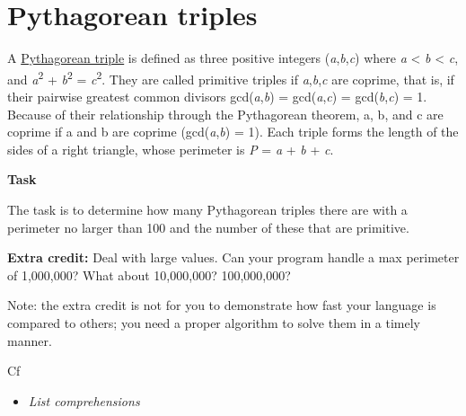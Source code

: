 \pagebreak{}
\section*{Pythagorean triples}

A \href{http://en.wikipedia.org/wiki/Pythagorean\_triple}{Pythagorean
triple} is defined as three positive integers
(\emph{a},\emph{b},\emph{c}) where \emph{a} \textless{} \emph{b}
\textless{} \emph{c}, and \emph{a}\textsuperscript{2} +
\emph{b}\textsuperscript{2} = \emph{c}\textsuperscript{2}. They are
called primitive triples if \emph{a},\emph{b},\emph{c} are coprime, that
is, if their pairwise greatest common divisors gcd(\emph{a},\emph{b}) =
gcd(\emph{a},\emph{c}) = gcd(\emph{b},\emph{c}) = 1. Because of their
relationship through the Pythagorean theorem, a, b, and c are coprime if
a and b are coprime (gcd(\emph{a},\emph{b}) = 1). Each triple forms the
length of the sides of a right triangle, whose perimeter is \emph{P} =
\emph{a} + \emph{b} + \emph{c}.

\textbf{Task}

The task is to determine how many Pythagorean triples there are with a
perimeter no larger than 100 and the number of these that are primitive.

\textbf{Extra credit:} Deal with large values. Can your program handle a
max perimeter of 1,000,000? What about 10,000,000? 100,000,000?

Note: the extra credit is not for you to demonstrate how fast your
language is compared to others; you need a proper algorithm to solve
them in a timely manner.

\begin{description}
\item[Cf]
\end{description}

\begin{itemize}
\item
  \emph{List comprehensions}
\end{itemize}



